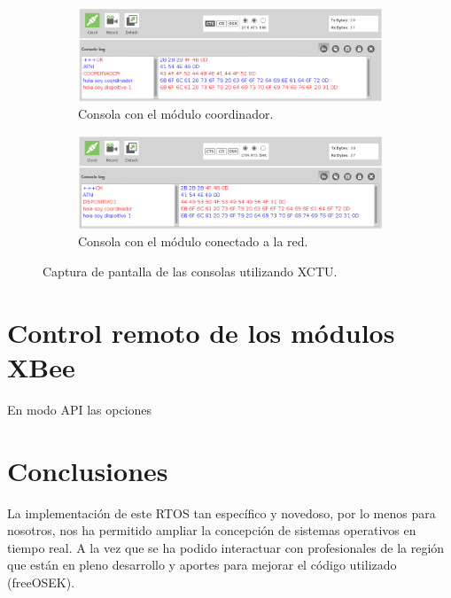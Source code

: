 \documentclass[11pt,oneside,spanish,a4paper]{article}
\begin{document}
\begin{figure}[ht]
  \centering
  \begin{subfigure}{0.8\textwidth}
    \centering
    \includegraphics[width=\textwidth]{img/terminal-coord}
    \caption{Consola con el módulo coordinador.}
    \label{fig:term-coord}
  \end{subfigure}
  \begin{subfigure}{0.8\textwidth}
    \centering
    \includegraphics[width=\textwidth]{img/terminal-dispo}
    \caption{Consola con el módulo conectado a la red.}
    \label{fig:term-end}
  \end{subfigure}
  \caption{Captura de pantalla de las consolas utilizando XCTU.}
  \label{fig:terminales}
\end{figure}

\section{Control remoto de los módulos XBee}
\label{sec:remoto}

En modo API las opciones 


\section{Conclusiones}
\label{sec:conc}

La implementación de este RTOS tan específico y novedoso, por lo menos
para nosotros, nos ha permitido ampliar la concepción de sistemas
operativos en tiempo real. A la vez que se ha podido interactuar con
profesionales de la región que están en pleno desarrollo y aportes
para mejorar el código utilizado (freeOSEK). 
\end{document}
